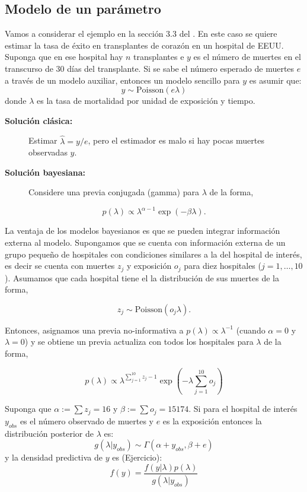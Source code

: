 \documentclass[
  12pt,
]{book}
\theoremstyle{definition}
\theoremstyle{definition}
\theoremstyle{definition}
\theoremstyle{definition}
\theoremstyle{remark}
\begin{document}
\hypertarget{modelo-de-un-paruxe1metro}{%
\subsection{Modelo de un parámetro}\label{modelo-de-un-paruxe1metro}}

Vamos a considerar el ejemplo en la sección 3.3 del \autocite{Albert2009}. En este caso se quiere estimar la tasa de éxito en transplantes de corazón en un hospital de EEUU. Suponga que en ese hospital hay \(n\) transplantes e \(y\) es el número de muertes en el transcurso de 30 días del transplante. Si se sabe el número esperado de muertes \(e\) a través de un modelo auxiliar, entonces un modelo sencillo para \(y\) es asumir que:
\[y\sim \text{Poisson}(e\lambda)\]
donde \(\lambda\) es la tasa de mortalidad por unidad de exposición y tiempo.

\begin{description}
\item[\textbf{Solución clásica:}]
Estimar \(\hat \lambda=y/e\), pero el estimador es malo si hay pocas muertes observadas \(y\).
\item[\textbf{Solución bayesiana:}]
Considere una previa conjugada (gamma) para \(\lambda\) de la forma,
\end{description}

\[p(\lambda)\propto \lambda^{\alpha-1}\exp(-\beta \lambda).\]

La ventaja de los modelos bayesianos es que se pueden integrar información externa al modelo. Supongamos que se cuenta con información externa de un grupo pequeño de hospitales con condiciones similares a la del hospital de interés, es decir se cuenta con muertes \(z_j\) y exposición \(o_j\) para diez hospitales (\(j=1,\ldots,10\)). Asumamos que cada hospital tiene el la distribución de sus muertes de la forma,

\[z_j\sim \text{Poisson}(o_j\lambda).\]

Entonces, asignamos una previa no-informativa a \(p(\lambda)\propto \lambda^{-1}\) (cuando \(\alpha=0\) y \(\lambda=0\)) y se obtiene un previa actualiza con todos los hospitales para \(\lambda\) de la forma,

\[p(\lambda)\propto \lambda^{\sum_{j=1}^{10}z_j-1}\exp{\left(-\lambda\sum_{j=1}^{10} o_j\right)}\]

Suponga que \(\alpha:=\sum z_j=16\) y \(\beta:=\sum o_j=15174\). Si para el hospital de interés \(y_{obs}\) es el número observado de muertes y \(e\) es la exposición entonces la distribución posterior de \(\lambda\) es:
\[g(\lambda|y_{obs})\sim \Gamma(\alpha+y_{obs},\beta+e)\]
y la densidad predictiva de \(y\) es (Ejercicio):
\[f(y)=\frac{f(y|\lambda)p(\lambda)}{g(\lambda|y_{obs})}\]
\end{document}
